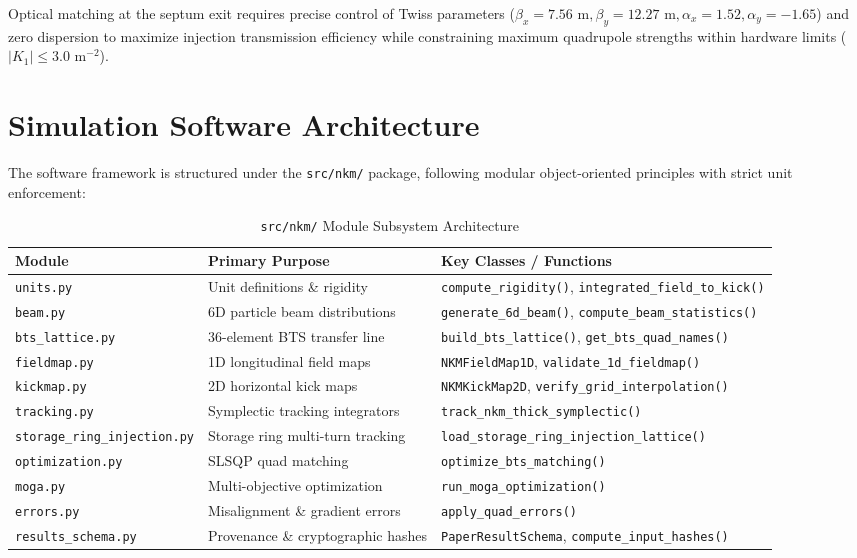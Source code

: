 \documentclass[11pt,a4paper]{article}
\begin{document}
Optical matching at the septum exit requires precise control of Twiss parameters ($\beta_x = 7.56\text{ m}, \beta_y = 12.27\text{ m}, \alpha_x = 1.52, \alpha_y = -1.65$) and zero dispersion to maximize injection transmission efficiency while constraining maximum quadrupole strengths within hardware limits ($|K_1| \le 3.0\text{ m}^{-2}$).

\section{Simulation Software Architecture}

The software framework is structured under the \texttt{src/nkm/} package, following modular object-oriented principles with strict unit enforcement:

\begin{table}[h]
\centering
\caption{\texttt{src/nkm/} Module Subsystem Architecture}
\begin{tabular}{llp{7.5cm}}
\toprule
\textbf{Module} & \textbf{Primary Purpose} & \textbf{Key Classes / Functions} \\
\midrule
\texttt{units.py} & Unit definitions \& rigidity & \texttt{compute\_rigidity()}, \texttt{integrated\_field\_to\_kick()} \\
\texttt{beam.py} & 6D particle beam distributions & \texttt{generate\_6d\_beam()}, \texttt{compute\_beam\_statistics()} \\
\texttt{bts\_lattice.py} & 36-element BTS transfer line & \texttt{build\_bts\_lattice()}, \texttt{get\_bts\_quad\_names()} \\
\texttt{fieldmap.py} & 1D longitudinal field maps & \texttt{NKMFieldMap1D}, \texttt{validate\_1d\_fieldmap()} \\
\texttt{kickmap.py} & 2D horizontal kick maps & \texttt{NKMKickMap2D}, \texttt{verify\_grid\_interpolation()} \\
\texttt{tracking.py} & Symplectic tracking integrators & \texttt{track\_nkm\_thick\_symplectic()} \\
\texttt{storage\_ring\_injection.py} & Storage ring multi-turn tracking & \texttt{load\_storage\_ring\_injection\_lattice()} \\
\texttt{optimization.py} & SLSQP quad matching & \texttt{optimize\_bts\_matching()} \\
\texttt{moga.py} & Multi-objective optimization & \texttt{run\_moga\_optimization()} \\
\texttt{errors.py} & Misalignment \& gradient errors & \texttt{apply\_quad\_errors()} \\
\texttt{results\_schema.py} & Provenance \& cryptographic hashes & \texttt{PaperResultSchema}, \texttt{compute\_input\_hashes()} \\
\bottomrule
\end{tabular}
\end{table}
\end{document}
